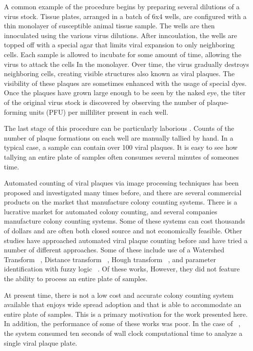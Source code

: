 \documentclass[11pt,final,twocolumn]{IEEEtran}
\begin{document}
A common example of the procedure begins by preparing several dilutions of a virus stock. Tissue plates, arranged in a batch of 6x4 wells, are configured with a thin monolayer of susceptible animal tissue sample.  The wells are then innoculated using the various virus dilutions. After inncoulation, the wells are topped off with a special agar that limits viral expansion to only neighboring cells. Each sample is allowed to incubate for some amount of time, allowing the virus to attack the cells In the monolayer. Over time, the virus gradually destroys neighboring cells, creating visible structures also known as viral plaques. The visibility of these plaques are sometimes enhanced with the usage of special dyes. Once the plaques have grown large enough to be seen by the naked eye, the titer of the original virus stock is discovered by observing the number of  plaque-forming units (PFU) per milliliter present in each well.

The last stage of this procedure can be particularly laborious . Counts  of the number of plaque formations on each well are manually tallied by hand. In a typical case, a sample can contain over 100 viral plaques. It is easy to see how tallying an entire plate of samples often consumes several minutes of someones time. 


Automated counting of viral plaques via image processing techniques  has been proposed and investigated many times before, and there are several commercial products on the market that manufacture colony counting systems. There is a lucrative market for automated colony counting, and several companies manufacture colony counting systems. Some of these systems can cost thousands of dollars and are often both closed source and not economically feasible. Other studies have approached automated viral plaque counting before and have tried a number of different  approaches. Some of these include use of a Watershed Transform ~\cite{watershed}, Distance transform ~\cite{distanceTransform},  Hough transform ~\cite{houghTransform}, and parameter identification with fuzzy logic ~\cite{parameterIdentification}. Of these works, However,  they did not feature the ability to process an entire plate of samples. 

At present time,  there is not a low cost and  accurate colony counting system available that enjoys wide spread adoption and that is able to accommodate an entire plate of samples. This is a primary motivation for the work presented here. In addition, the performance of some of these works was poor. In the case of ~\cite{watershed}, the system consumed ten seconds of wall clock computational time to analyze a single viral plaque plate. 
\end{document}
